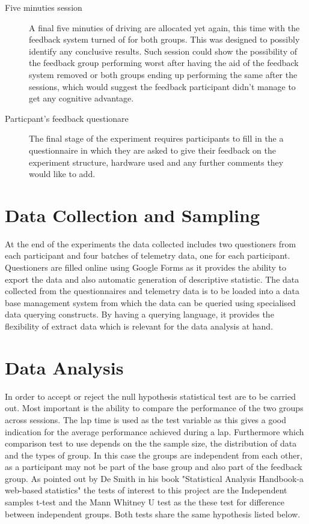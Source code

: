 \begin{description}
	\item[Five minuties session] A final five minuties of driving are allocated yet again, this time with the feedback system turned of for both groups. This was designed to possibly identify any conclusive results. Such session could show the possibility of the feedback group performing worst after having the aid of the feedback system removed or both groups ending up performing the same after the sessions, which would suggest the feedback participant didn't manage to get any cognitive advantage.
	
	\item[Particpant's feedback questionare] The final stage of the experiment requires participants to fill in the a questionnaire  in which they are asked to give their feedback on the experiment structure, hardware used and any further comments they would like to add.
	
\end{description}

\section{Data Collection and Sampling}
\label{sec:meth-data-gathering}
At the end of the experiments the data collected includes two questioners from each participant and four batches of telemetry data, one for each participant. Questioners are filled online using Google Forms as it provides the ability to export the data and also automatic generation of descriptive statistic. The data collected from the questionnaires and telemetry data is to be loaded into a data base management system from which the data can be queried using specialised data querying constructs. By having a querying language, it provides the flexibility of extract data which is relevant for the data analysis at hand.

\section{Data Analysis}
\label{sec:meth-data-analysis}
In order to accept or reject the null hypothesis statistical test are to be carried out. Most important is the ability to compare the performance of the two groups across sessions. The lap time is used as the test variable as this gives a good indication for the average performance achieved during a lap. Furthermore which comparison test to use depends on the the sample size, the distribution of data and the types of group. In this case the groups are independent from each other, as a participant may not be part of the base group and also part of the feedback group. As pointed out by De Smith in his book "Statistical Analysis Handbook-a web-based statistics" the tests of interest to this project are the Independent samples t-test\cite{de2015statsref} and the Mann Whitney U test\cite{de2015statsref} as the these test for difference between independent groups. Both tests share the same hypothesis listed below.

